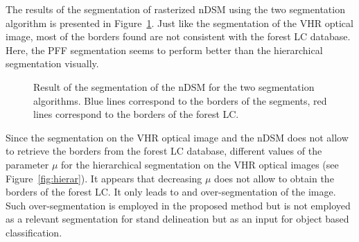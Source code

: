 The results of the segmentation of rasterized nDSM using the two segmentation algorithm is presented in Figure~\ref{fig:seg_nDSM}. Just like the segmentation of the VHR optical image, most of the borders found are not consistent with the forest LC database. Here, the PFF segmentation seems to perform better than the hierarchical segmentation visually.


\begin{figure}[htbp]
\begin{center}
\begingroup
\captionsetup[subfigure]{width=0.4\textwidth}
\hspace*{0.05\textwidth}
\endgroup
\caption{Result of the segmentation of the nDSM for the two segmentation algorithms. Blue lines correspond to the borders of the segments, red lines correspond to the borders of the forest LC.}
\label{fig:seg_nDSM}
\end{center}
\end{figure}

Since the segmentation on the VHR optical image and the nDSM does not allow to retrieve the borders from the forest LC database, different values of the parameter $\mu$ for the hierarchical segmentation on the VHR optical images (see Figure~\ref{fig:hierar}). It appears that decreasing $\mu$ does not allow to obtain the borders of the forest LC. It only leads to and over-segmentation of the image. Such over-segmentation is employed in the proposed method but is not employed as a relevant segmentation for stand delineation but as an input for object based classification.

